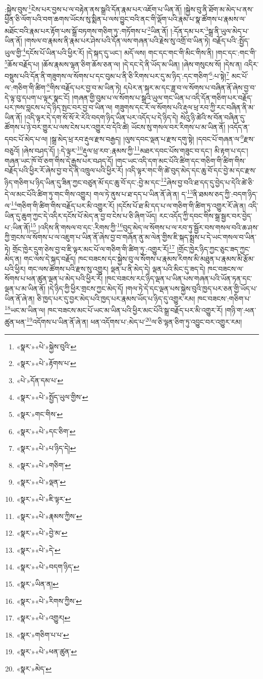 :སྐྱེས་བུས་\footnote{«སྣར་»«པེ་»སྐྱེས་བུའི་}ངེས་པར་བྱས་པ་ལ་བརྟེན་ནས་སྒྲའི་དོན་རྣམ་པར་འཇོག་པ་ཡིན་ནོ། །སྐྱེས་བུ་ནི་ཐོག་མ་མེད་པ་ནས་ཕྱིན་ཅི་ལོག་པའི་བག་ཆགས་ཡོངས་སུ་སྨིན་པ་ལས་བྱུང་བའི་ནང་གི་ལྡོག་པའི་རྣམ་པ་སྣ་ཚོགས་པ་རྣམས་ལ་མཐོང་བའི་རྣམ་པར་རྟོག་པས་སྒྲོ་བཏགས་གཅིག་ཏུ་:གཏོགས་པ་\footnote{«སྣར་»«པེ་»རྟོགས་པ་}ཡིན་ནོ། །:དོན་དམ་པར་\footnote{«པེ་»དོན་དམ་པ་}སྒྲ་ནི་ཡུལ་མེད་པ་ཡིན་ནོ། །གསལ་བ་རྣམས་ནི་རྣམ་པར་ཤེས་པའི་དོན་ལས་གཞན་པའི་རྗེས་སུ་འགྲོ་བ་ཡིན་ཏེ། བརྗོད་པའི་:སྤྱོད་ཡུལ་གྱི་\footnote{«སྣར་»«པེ་»སྤྱོད་ཡུལ་གྱིས་}དངོས་པོ་ཡིན་པའི་ཕྱིར་རོ། །དེ་སྐད་དུ་ཡང་། མདོ་ལས། གང་དང་གང་གི་མིང་གིས་ནི། །གང་དང་:གང་གི་\footnote{«སྣར་»གང་གིས་}ཆོས་བརྗོད་པ། །ཆོས་རྣམས་ལྷན་ཅིག་ཆོས་ཅན་ལ། །དེ་དང་དེ་ནི་ཡོད་མ་ཡིན། །ཞེས་གསུངས་སོ། །དེས་ན། འདིར་བསྡུས་པའི་དོན་ནི་གཟུགས་ལ་སོགས་པ་དང་བུམ་པ་ནི་ཅི་རིགས་པར་དུ་མ་ཉིད་:དང་གཅིག་\footnote{«སྣར་»«པེ་»དང་ཅིག་}:པ་སྟེ།\footnote{«སྣར་»«པེ་»པ་ཉིད་དེ།} མང་པོ་ལ་:གཅིག་གི་ཚིག་\footnote{«སྣར་»«པེ་»གཅིག་}གིས་བརྗོད་པར་བྱ་བ་མ་ཡིན་ཏེ། དཔེར་ན་སྐར་མ་དང་ཟླ་བ་ལ་སོགས་པ་བཞིན་ནོ་ཞེས་བྱ་བ་དེ་ལྟ་བུ་དཔག་པ་ལྟར་སྣང་ངོ། །གཞན་གྱི་བུམ་པ་ལ་སོགས་པ་སྒྲའི་ཡུལ་གང་ཡིན་པ་འདི་དོན་གཅིག་པར་བརྗོད་པར་ཁས་བླངས་པ་དེ་ཉིད་སྤང་བར་བྱ་བ་ཡིན་ལ། གཟུགས་དང་རོ་ལ་སོགས་པའི་རྡུལ་ཕྲ་རབ་ཀྱི་རང་བཞིན་ནི་མ་ཡིན་ནོ། །འདི་ལྟར་དེ་དག་སོ་སོ་རེ་རེའི་བདག་ཉིད་ཡིན་པར་འདོད་པ་དེ་ཉིད་དེ། སེའུ་ཉི་ཚེའི་ས་བོན་བཞིན་དུ་ཚོགས་པ་ཉེ་བར་གྱུར་པ་ལས་ངེས་པར་འགྱུར་བ་དེའི་ཚེ། ཡོངས་སུ་གསལ་བར་རིགས་པ་མ་ཡིན་ནོ། །འདོད་ན་དབང་པོ་མེད་པ་ལ། །སྒྲ་མེད་ཕྲ་རབ་རྡུལ་རྫས་བརྒྱད། །ལུས་དབང་ལྡན་པ་རྫས་དགུ་སྟེ། །དབང་པོ་གཞན་ལ་\footnote{«སྣར་»«པེ་»ལྡན་}རྫས་བཅུའོ། །ཞེས་བཤད་དོ། །:དེ་ལྟར་\footnote{«སྣར་»«པེ་»ཇི་ལྟར་}རྡུལ་ཕྲ་རབ་:རྣམས་ཀྱི་\footnote{«སྣར་»«པེ་»རྣམས་ཀྱིས་}མཐར་དབང་པོས་གཟུང་བ་དང་། མི་རྟག་པ་དང་། གཞན་ཡང་ཁོ་བོ་ཅག་གིས་དེ་རྒྱས་པར་བཤད་དོ། །གང་ཡང་འདི་དག་མང་པོའི་ཚིག་དང་གཅིག་གི་ཚིག་གིས་བརྗོད་པའི་ཕྱིར་རོ་ཞེས་བྱ་བ་དེ་ནི་འཁྲུལ་པའི་ཕྱིར་རོ། །འདི་ལྟར་གང་གི་ཚེ་བུད་མེད་དང་ཆུ་བོ་དང་བྱེ་མ་དང་རྫས་ཉིད་གཅིག་པ་ཉིད་ཡིན་དུ་ཟིན་ཀྱང་བཙུན་མོ་དང་ཆུ་བོ་དང་:བྱེ་མ་དང་\footnote{«སྣར་»«པེ་»བྱེ་མ་}ཞེས་བྱ་བའི་ཐ་དད་དུ་བྱེད་པ་དེའི་ཚེ་ཅི་དེ་ལ་མང་པོའི་ཚིག་ཏུ་གང་གིས་འགྱུར། གལ་ཏེ་ནུས་པ་ཐ་དད་པ་ཡིན་ནོ་ཞེ་ན། ད་\footnote{«སྣར་»«པེ་»དེ་}ནི་ཐམས་ཅད་ཀྱི་:བདག་ཉིད་ལ་\footnote{«སྣར་»«པེ་»བདག་ཉིད་}གཅིག་གི་ཚིག་གིས་བརྗོད་པར་མི་འགྱུར་རོ། །དངོས་པོ་ཐ་མི་དད་པ་ལ་གཅིག་གི་ཚིག་ཏུ་འགྱུར་རོ་ཞེ་ན། འདི་ཡིན་དུ་ཆུག་ཀྱང་དེ་འདིར་དངོས་པོ་མེད་ན་བྱ་བ་ངེས་པ་ཅི་ཞིག་ཡོད། རང་འདོད་ཀྱི་དབང་གིས་སྒྲ་སྦྱར་བར་བྱེད་པ་:ཡིན་ནོ།\footnote{«སྣར་»ཡིན་ན།} །འདིས་ནི་གསལ་བ་དང་:རིགས་ཀྱི་\footnote{«སྣར་»«པེ་»རིགས་ཀྱིས་}བུད་མེད་ལ་སོགས་པ་ལ་རབ་ཏུ་སྦྱོར་བས་གསལ་བའི་ཆ་ཤས་ཀྱི་གྲངས་ལ་སོགས་པ་ལ་འཇུག་པ་ཡིན་ནོ་ཞེས་བྱ་བ་གཞོན་ནུ་མ་ལེན་གྱིས་ཇི་སྐད་སྨྲས་པ་དེ་ཡང་གསལ་བ་ཡིན་ཏེ། གྲོང་ཁྱེར་དྲུག་ཅེས་བྱ་བ་ཇི་ལྟར་མང་པོ་ལ་གཅིག་གི་ཚིག་ཏུ་:འགྱུར་རོ།\footnote{«སྣར་»«པེ་»འགྱུར།} །གྲོང་ཁྱེར་ཉིད་ཀྱང་ཅུང་ཟད་ཀྱང་མེད་ན། གང་ལས་དེ་སྐད་བརྗོད། ཁང་བཟངས་དང་སྐྱེས་བུ་ལ་སོགས་པ་རྣམས་རིགས་མི་མཐུན་པ་རྣམས་མི་རྩོམ་པའི་ཕྱིར། གང་ལས་ཚོགས་པའི་རྫས་སུ་འགྱུར། ལྡན་པ་ནི་མེད་དེ། ལྡན་པའི་མིང་དུ་ཟད་དེ། ཁང་བཟངས་ལ་སོགས་པ་ཕན་ཚུན་ལྡན་པ་མེད་པའི་ཕྱིར་རོ། །ཁང་བཟངས་རང་ཉིད་ལྡན་པ་ཡིན་པས་གཞན་པའི་ཡོན་ཏན་དང་ལྡན་པ་མ་ཡིན་ནོ། །དེ་ཉིད་ཀྱི་ཕྱིར་གྲངས་ཀྱང་མེད་དོ། །གལ་ཏེ་དེ་དང་ལྡན་པས་སྐྱེས་བུའི་ཁྱད་པར་ཅན་གྱི་ཡོད་པ་ཡིན་ནོ་ཞེ་ན། ཅི་ཁྱད་པར་དུ་བྱར་མེད་པའི་ཁྱད་པར་རྣམས་ཡོད་པ་ཉིད་དུ་འགྱུར་རམ། ཁང་བཟངས་:གཅིག་པ་\footnote{«སྣར་»གཅིག་པ་པ་}ཡང་མ་ཡིན་ལ། ཁང་བཟངས་མང་པོ་ཡང་མ་ཡིན་པའི་ཕྱིར་མང་པོའི་སྒྲ་བརྗོད་པར་མི་འགྱུར་རོ། །གཉི་ག་:ཕན་ཚུན་ཕན་\footnote{«སྣར་»«པེ་»ཕན་ཚུན་}འདོགས་པ་ཡིན་ནོ་ཞེ་ན། ཕན་འདོགས་པ་:མེད་པ་\footnote{«སྣར་»མེད་}ལ་ཅི་ལྷན་ཅིག་ཏུ་འབྱུང་བར་འགྱུར་རམ། 